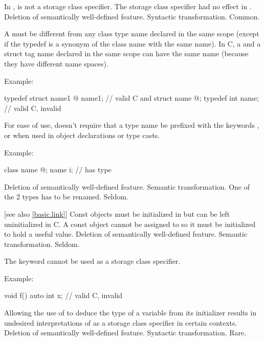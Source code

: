 \change
In \Cpp{},  is not a storage class specifier.
\rationale
The storage class specifier had no effect in \Cpp{}.
\effect
Deletion of semantically well-defined feature.
\difficulty
Syntactic transformation.
\howwide
Common.

\change
A \Cpp{}  must be different from any class type name declared
in the same scope (except if the typedef is a synonym of the class name with the
same name). In C, a  and a struct tag name declared in the same scope
can have the same name (because they have different name spaces).

Example:
\begin{codeblock}
typedef struct name1 { @\commentellip@ } name1;         // valid C and \Cpp{}
struct name { @\commentellip@ };
typedef int name;               // valid C, invalid \Cpp{}
\end{codeblock}

\rationale
For ease of use, \Cpp{} doesn't require that a type name be prefixed
with the keywords ,  or  when used in object
declarations or type casts.

Example:
\begin{codeblock}
class name { @\commentellip@ };
name i;                         //  has type 
\end{codeblock}

\effect
Deletion of semantically well-defined feature.
\difficulty
Semantic transformation.
One of the 2 types has to be renamed.
\howwide
Seldom.

 [see also \ref{basic.link}]
\change
Const objects must be initialized in \Cpp{} but can be left uninitialized in C.
\rationale
A const object cannot be assigned to so it must be initialized
to hold a useful value.
\effect
Deletion of semantically well-defined feature.
\difficulty
Semantic transformation.
\howwide
Seldom.

\change
The keyword  cannot be used as a storage class specifier.

Example:
\begin{codeblock}
void f() {
  auto int x;       // valid C, invalid \Cpp{}
}
\end{codeblock}

\rationale
Allowing the use of  to deduce the type
of a variable from its initializer results in undesired interpretations of
 as a storage class specifier in certain contexts.
\effect
Deletion of semantically well-defined feature.
\difficulty
Syntactic transformation.
\howwide
Rare.

